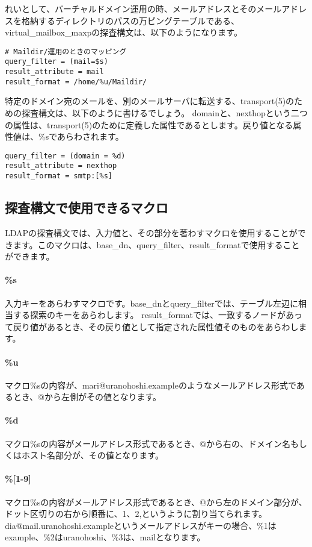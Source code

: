 れいとして、バーチャルドメイン運用の時、メールアドレスとそのメールアドレスを格納するディレクトリのパスの万ピングテーブルである、virtual\_mailbox\_maxpの探査構文は、以下のようになります。

\begin{verbatim}
# Maildir/運用のときのマッピング
query_filter = (mail=$s)
result_attribute = mail
result_format = /home/%u/Maildir/
\end{verbatim}

特定のドメイン宛のメールを、別のメールサーバに転送する、transport(5)のための探査構文は、以下のように書けるでしょう。
domainと、nexthopという二つの属性は、transport(5)のために定義した属性であるとします。戻り値となる属性値は、\%sであらわされます。

\begin{verbatim}
query_filter = (domain = %d)
result_attribute = nexthop
result_format = smtp:[%s]
\end{verbatim}

\subsection{探査構文で使用できるマクロ}

LDAPの探査構文では、入力値と、その部分を著わすマクロを使用することができます。このマクロは、base\_dn、query\_filter、result\_formatで使用することができます。

\paragraph{\%s}
入力キーをあらわすマクロです。base\_dnとquery\_filterでは、テーブル左辺に相当する探索のキーをあらわします。
result\_formatでは、一致するノードがあって戻り値があるとき、その戻り値として指定された属性値そのものをあらわします。

\paragraph{\%u}
マクロ\%sの内容が、mari@uranohoshi.exampleのようなメールアドレス形式であるとき、@から左側がその値となります。

\paragraph{\%d}
マクロ\%sの内容がメールアドレス形式であるとき、@から右の、ドメイン名もしくはホスト名部分が、その値となります。

\paragraph{\%[1-9]}
マクロ\%sの内容がメールアドレス形式であるとき、@から左のドメイン部分が、ドット区切りの右から順番に、1、2,というように割り当てられます。dia@mail.uranohoshi.exampleというメールアドレスがキーの場合、\%1はexample、\%2はuranohoshi、\%3は、mailとなります。

